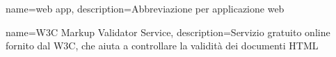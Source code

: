 {
	name=web app,
	description={Abbreviazione per applicazione web}
}

{
	name=W3C Markup Validator Service,
	description={Servizio gratuito online fornito dal W3C, che aiuta a controllare la validità dei documenti HTML}
}
